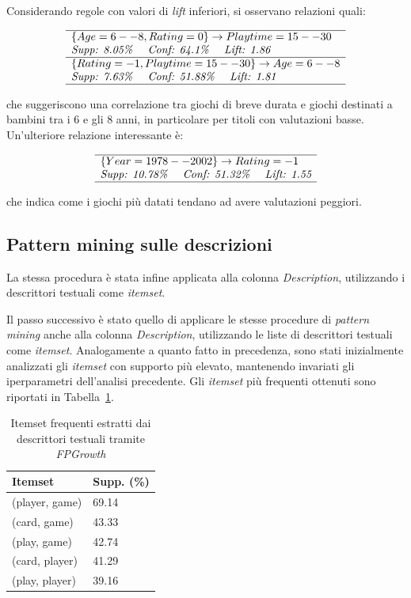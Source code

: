 \documentclass[10pt,twocolumn]{article}
\begin{document}
Considerando regole con valori di \textit{lift} inferiori, si osservano relazioni quali:

\[
\begin{array}{l}
\hline
\{Age=6--8, Rating=0\} \to Playtime=15--30 \\
\textit{Supp: 8.05\% \quad Conf: 64.1\% \quad Lift: 1.86} \\
\hline
\{Rating=-1, Playtime=15--30\} \to Age=6--8 \\
\textit{Supp: 7.63\% \quad Conf: 51.88\% \quad Lift: 1.81} \\
\hline
\end{array}
\]

che suggeriscono una correlazione tra giochi di breve durata e giochi destinati a bambini tra i 6 e gli 8 anni, in particolare per titoli con valutazioni basse. Un’ulteriore relazione interessante è:

\[
\begin{array}{l}
\hline
\{Year=1978--2002\} \to Rating=-1 \\
\textit{Supp: 10.78\% \quad Conf: 51.32\% \quad Lift: 1.55} \\
\hline
\end{array}
\]

che indica come i giochi più datati tendano ad avere valutazioni peggiori.

\subsection{Pattern mining sulle descrizioni}

La stessa procedura è stata infine applicata alla colonna \textit{Description}, utilizzando i descrittori testuali come \textit{itemset}.

Il passo successivo è stato quello di applicare le stesse procedure di \textit{pattern mining} anche alla colonna \textit{Description}, utilizzando le liste di descrittori testuali come \textit{itemset}. Analogamente a quanto fatto in precedenza, sono stati inizialmente analizzati gli \textit{itemset} con supporto più elevato, mantenendo invariati gli iperparametri dell’analisi precedente. Gli \textit{itemset} più frequenti ottenuti sono riportati in Tabella~\ref{tab:itemsets_descriptors}.

\begin{table}[ht]
\centering
\begin{tabular}{|l|l|}
    \hline
    Itemset & Supp. (\%) \\
    \hline
    (player, game) & 69.14 \\
    (card, game)   & 43.33 \\
    (play, game)   & 42.74 \\
    (card, player) & 41.29 \\
    (play, player) & 39.16 \\
    \hline
\end{tabular}
\caption{Itemset frequenti estratti dai descrittori testuali tramite \textit{FPGrowth}}
\label{tab:itemsets_descriptors}
\end{table}
\end{document}
